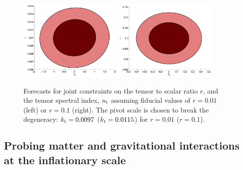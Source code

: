\begin{figure}[htbp!]
\centering
\includegraphics[width=0.45\textwidth]{Inflation/r_nt_r01_kt0097.png}
\includegraphics[width=0.45\textwidth]{Inflation/r_nt_r1_kt0115.png}
\caption{ Forecasts for joint constraints on the tensor to scalar ratio $r$, and the tensor spectral index, $n_{\rm t}$ assuming fiducial values of $r=0.01$ (left) or $r=0.1$ (right). The pivot scale is chosen to break the degeneracy: $k_{\rm t}=0.0097$ ($k_{\rm t}=0.0115$) for $r=0.01$ ($r=0.1$).}
\label{fig:rnT}
\end{figure}

\subsection{Probing matter and gravitational interactions at the inflationary scale}\label{subsubsec:Interactions}
\label{subsec:sst}

